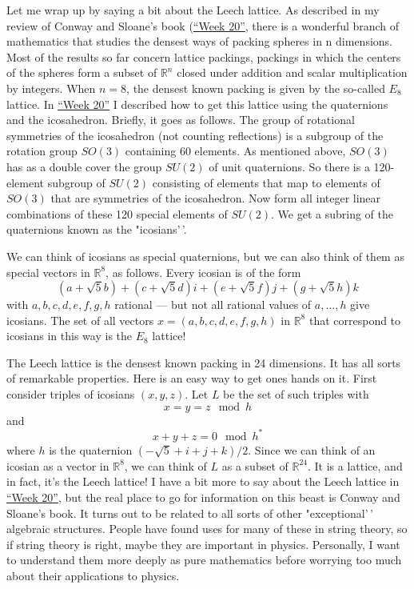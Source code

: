 \documentclass{article}
\begin{document}
Let me wrap up by saying a bit about the Leech lattice. As described in
my review of Conway and Sloane's book (\protect\hyperlink{week20}{``Week
20''}, there is a wonderful branch of mathematics that studies the
densest ways of packing spheres in n dimensions. Most of the results so
far concern lattice packings, packings in which the centers of the
spheres form a subset of \(\mathbb{R}^n\) closed under addition and
scalar multiplication by integers. When \(n = 8\), the densest known
packing is given by the so-called \(E_8\) lattice. In
\protect\hyperlink{week20}{``Week 20''} I described how to get this
lattice using the quaternions and the icosahedron. Briefly, it goes as
follows. The group of rotational symmetries of the icosahedron (not
counting reflections) is a subgroup of the rotation group \(SO(3)\)
containing 60 elements. As mentioned above, \(SO(3)\) has as a double
cover the group \(SU(2)\) of unit quaternions. So there is a 120-element
subgroup of \(SU(2)\) consisting of elements that map to elements of
\(SO(3)\) that are symmetries of the icosahedron. Now form all integer
linear combinations of these 120 special elements of \(SU(2)\). We get a
subring of the quaternions known as the "icosians'\,'.

We can think of icosians as special quaternions, but we can also think
of them as special vectors in \(\mathbb{R}^8\), as follows. Every
icosian is of the form
\[(a + \sqrt{5} b) + (c + \sqrt{5} d)i + (e + \sqrt{5} f)j + (g + \sqrt{5} h)k\]
with \(a,b,c,d,e,f,g,h\) rational --- but not all rational values of
\(a,\ldots,h\) give icosians. The set of all vectors
\(x = (a,b,c,d,e,f,g,h)\) in \(\mathbb{R}^8\) that correspond to
icosians in this way is the \(E_8\) lattice!

The Leech lattice is the densest known packing in 24 dimensions. It has
all sorts of remarkable properties. Here is an easy way to get ones
hands on it. First consider triples of icosians \((x,y,z)\). Let \(L\)
be the set of such triples with \[x = y = z \mod h\] and
\[x + y + z = 0 \mod h^*\] where \(h\) is the quaternion
\((-\sqrt{5} + i + j + k)/2\). Since we can think of an icosian as a
vector in \(\mathbb{R}^8\), we can think of \(L\) as a subset of
\(\mathbb{R}^{24}\). It is a lattice, and in fact, it's the Leech
lattice! I have a bit more to say about the Leech lattice in
\protect\hyperlink{week20}{``Week 20''}, but the real place to go for
information on this beast is Conway and Sloane's book. It turns out to
be related to all sorts of other "exceptional'\,' algebraic structures.
People have found uses for many of these in string theory, so if string
theory is right, maybe they are important in physics. Personally, I want
to understand them more deeply as pure mathematics before worrying too
much about their applications to physics.
\end{document}
